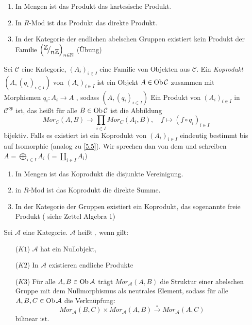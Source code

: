 \begin{bsp}
	\begin{enumerate} [label=\alph*)]
		\item In Mengen ist das Produkt das kartesische Produkt.
		\item In $R$-Mod ist das Produkt das direkte Produkt.
		\item In der Kategorie der endlichen abelschen Gruppen existiert kein Produkt der Familie $\left( \QR{\Z}{n\Z}\right)_{n \in \N}$ (Übung)
	\end{enumerate}
\end{bsp}
\begin{bem+df}\label{5.7}
	Sei $\mathcal{C} $ eine Kategorie, $ (A_i)_{i \in I}$ eine Familie von Objekten  aus $ \mathcal{C}$. Ein \emph{Koprodukt} $(A, (q_i)_{i \in I})$ von $(A_i)_{i \in I}$ ist ein Objekt $ A \in \text{Ob}\,\mathcal{C} $ zusammen mit Morphismen $ q_i: A_i \to A$ , sodass $(A, (q_i)_{i \in I})$ Ein Produkt von $(A_i)_{i \in I } $ in $ \mathcal{C}^{op} $ ist, das heißt für alle $ B \in \text{Ob}\,\mathcal{C} $ ist die Abbildung $$ Mor_C(A,B) \to \prod_{i \in I} Mor_C(A_i,B) , \quad f \mapsto (f \circ q_i) _{i \in I} $$ bijektiv. Falls es existiert ist ein Koprodukt von $(A_i)_{i \in I }$ eindeutig bestimmt bis auf Isomorphie (analog zu \ref{5.5}). Wir sprechen dan von dem  und schreiben $ A = \bigoplus_{i \in I} A_i $ ($=\coprod_{i\in I} A_i$)
\end{bem+df}
\begin{bsp}
	\begin{enumerate} [label=\alph*)]
		\item In Mengen ist das Koprodukt die disjunkte Vereinigung.
		\item in $R$-Mod ist das Koprodukt die direkte Summe.
		\item In der Kategorie der Gruppen existiert ein Koprodukt, das sogenannte freie Produkt ( siehe Zettel Algebra 1)
	\end{enumerate}
\end{bsp}
\begin{df}\label{5.9}
	Sei $\mathcal{A} $ eine Kategorie. $\mathcal{A} $ heißt , wenn gilt:
	\begin{enumerate}
		\item[($K1$)] $\mathcal{A}$ hat ein Nullobjekt,
		\item[($K2$)] In $\mathcal{A}$ existieren endliche Produkte
		\item[($K3$)] Für alle $A,B \in \text{Ob}\,\mathcal{A}$ trägt $Mor_{\mathcal{A}}(A,B) $ die Struktur einer abelschen Gruppe mit dem Nullmorphismus als neutrales Element, sodass für alle $ A,B,C \in \text{Ob}\,\mathcal{A} $ die Verknüpfung:
		 $$ Mor_{\mathcal{A}}(B,C) \times  Mor_{\mathcal{A}}(A,B) \overset{\circ}{\longrightarrow}Mor_{\mathcal{A}}(A,C)$$ bilinear ist.
	\end{enumerate}
\end{df}
